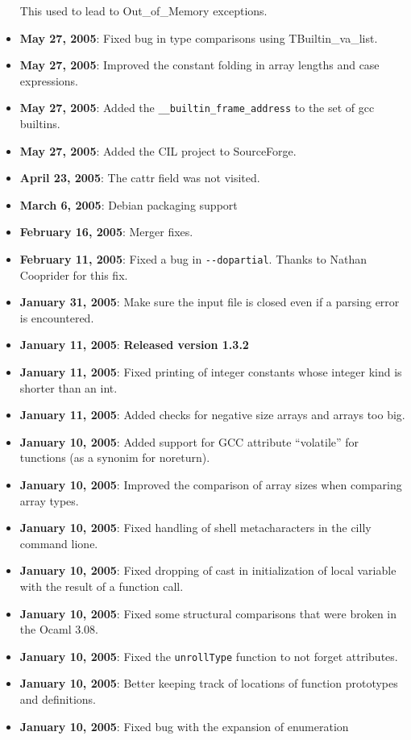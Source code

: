 \documentclass[letterpaper]{article}
\def\t#1{{\tt #1}}
\begin{document}
\begin{itemize}
  This used to lead to Out\_of\_Memory exceptions.
\item {\bf May 27, 2005}: Fixed bug in type comparisons using
  TBuiltin\_va\_list.
\item {\bf May 27, 2005}: Improved the constant folding in array lengths and
  case expressions. 
\item {\bf May 27, 2005}: Added the \t{\_\_builtin\_frame\_address} to the set
  of gcc builtins.
\item {\bf May 27, 2005}: Added the CIL project to SourceForge.
\item {\bf April 23, 2005}: The cattr field was not visited.
\item {\bf March 6, 2005}: Debian packaging support
\item {\bf February 16, 2005}: Merger fixes.
\item {\bf February 11, 2005}: Fixed a bug in \t{-{}-dopartial}. Thanks to
Nathan Cooprider for this fix. 
\item {\bf January 31, 2005}: Make sure the input file is closed even if a
  parsing error is encountered. 
\item {\bf January 11, 2005}: {\bf Released version 1.3.2}
\item {\bf January 11, 2005}: Fixed printing of integer constants whose
  integer kind is shorter than an int. 
\item {\bf January 11, 2005}: Added checks for negative size arrays and arrays
  too big. 
\item {\bf January 10, 2005}: Added support for GCC attribute ``volatile'' for
  tunctions (as a synonim for noreturn). 
\item {\bf January 10, 2005}: Improved the comparison of array sizes when
  comparing array types. 
\item {\bf January 10, 2005}: Fixed handling of shell metacharacters in the
  cilly command lione.
\item {\bf January 10, 2005}: Fixed dropping of cast in initialization of
  local variable with the result of a function call.
\item {\bf January 10, 2005}: Fixed some structural comparisons that were
  broken in the Ocaml 3.08.
\item {\bf January 10, 2005}: Fixed the \t{unrollType} function to not forget
  attributes. 
\item {\bf January 10, 2005}: Better keeping track of locations of function
  prototypes and definitions. 
\item {\bf January 10, 2005}: Fixed bug with the expansion of enumeration

\end{itemize}
\end{document}
